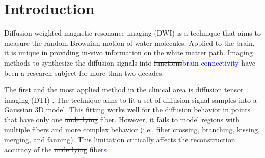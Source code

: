 \documentclass[twoside,twocolumn,10pt]{article}
\begin{document}

\section{Introduction}

\copyrightspace

Diffusion-weighted magnetic resonance imaging (DWI) is a technique that aims to measure the random Brownian motion of water molecules. Applied to the brain, it is unique in providing in-vivo information on the white matter path. Imaging methods to synthesize the diffusion signals into \sout{functions}\textcolor{blue}{brain connectivity} have been a research subject for more than two decades.

The first and the most applied method in the clinical area is diffusion tensor imaging (DTI) \cite{Basser1994}. The technique aims to fit a set of diffusion signal samples into a Gaussian 3D model.
This fitting works  well for the diffusion behavior in points that have only one \sout{underlying} fiber. However, it fails to model regions with multiple fibers and more complex behavior (i.e., fiber crossing, branching, kissing, merging, and fanning). This limitation critically affects the reconstruction accuracy of the \sout{underlying} fiber\textcolor{blue}{s} \cite{descoteaux2015,SCHILLING2019194}.

\end{document}
